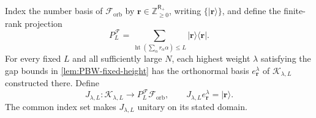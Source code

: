 \documentclass[11pt]{article}
\theoremstyle{remark}
\theoremstyle{plain}
\newcommand{\cF}{\mathcal F}
\newcommand{\ket}[1]{|#1\rangle}
\newcommand{\proj}[1]{|#1\rangle\!\langle #1|}
\begin{document}
Index the number basis of \(\cF_{\mathrm{orb}}\) by
\(\mathbf r\in\mathbb Z_{\ge0}^{\mathsf R_+}\), writing
\(\{\ket{\mathbf r}\}\), and define the finite-rank projection
\begin{equation}\label{eq:Fock-height-projection}
  P_L^{\cF}
  =\sum_{\operatorname{ht}(\sum_\alpha r_\alpha\alpha)\le L}
    \proj{\mathbf r}.
\end{equation}
For every fixed \(L\) and all sufficiently large \(N\), each highest
weight \(\lambda\) satisfying the gap bounds in
\cref{lem:PBW-fixed-height} has the orthonormal basis
\(e_{\mathbf r}^\lambda\) of \(\mathcal K_{\lambda,L}\) constructed there.
Define
\begin{equation}\label{eq:finite-coordinate-unitary}
  J_{\lambda,L}:\mathcal K_{\lambda,L}\longrightarrow
  P_L^{\cF}\cF_{\mathrm{orb}},
  \qquad
  J_{\lambda,L}e_{\mathbf r}^\lambda=\ket{\mathbf r}.
\end{equation}
The common index set makes \(J_{\lambda,L}\) unitary on its stated domain.
\end{document}
